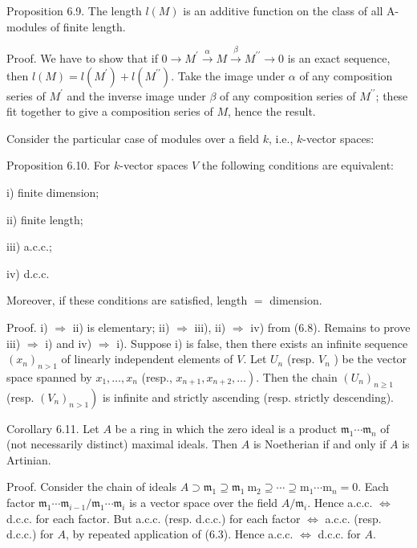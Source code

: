 \documentclass{standalone}
\theoremstyle{definition}
\theoremstyle{remark}
\begin{document}
Proposition 6.9. The length $l(M)$ is an additive function on the class of all A-modules of finite length.

Proof. We have to show that if $0 \rightarrow M^{\prime} \stackrel{\alpha}{\rightarrow} M \stackrel{\beta}{\rightarrow} M^{\prime \prime} \rightarrow 0$ is an exact sequence, then $l(M)=l\left(M^{\prime}\right)+l\left(M^{\prime \prime}\right)$. Take the image under $\alpha$ of any composition series of $M^{\prime}$ and the inverse image under $\beta$ of any composition series of $M^{\prime \prime}$; these fit together to give a composition series of $M$, hence the result.

Consider the particular case of modules over a field $k$, i.e., $k$-vector spaces:

Proposition 6.10. For $k$-vector spaces $V$ the following conditions are equivalent:

i) finite dimension;

ii) finite length;

iii) a.c.c.;

iv) d.c.c.

Moreover, if these conditions are satisfied, length $=$ dimension.

Proof. i) $\Rightarrow$ ii) is elementary; ii) $\Rightarrow$ iii), ii) $\Rightarrow$ iv) from (6.8). Remains to prove iii) $\Rightarrow$ i) and iv) $\Rightarrow$ i). Suppose i) is false, then there exists an infinite sequence $\left(x_{n}\right)_{n>1}$ of linearly independent elements of $V$. Let $U_{n}$ (resp. $V_{n}$ ) be the vector space spanned by $x_{1}, \ldots, x_{n}$ (resp., $\left.x_{n+1}, x_{n+2}, \ldots\right)$. Then the chain $\left(U_{n}\right)_{n \geqslant 1}$ (resp. $\left.\left(V_{n}\right)_{n>1}\right)$ is infinite and strictly ascending (resp. strictly descending).

Corollary 6.11. Let $A$ be a ring in which the zero ideal is a product $\mathfrak{m}_{1} \cdots \mathfrak{m}_{n}$ of (not necessarily distinct) maximal ideals. Then $A$ is Noetherian if and only if $A$ is Artinian.

Proof. Consider the chain of ideals $A \supset \mathfrak{m}_{1} \supseteq \mathfrak{m}_{1} \mathrm{~m}_{2} \supseteq \cdots \supseteq \mathrm{m}_{1} \cdots \mathrm{m}_{n}=0$. Each factor $\mathfrak{m}_{1} \cdots \mathfrak{m}_{i-1} / \mathfrak{m}_{1} \cdots \mathfrak{m}_{i}$ is a vector space over the field $A / \mathfrak{m}_{i}$. Hence a.c.c. $\Leftrightarrow$ d.c.c. for each factor. But a.c.c. (resp. d.c.c.) for each factor $\Leftrightarrow$ a.c.c. (resp. d.c.c.) for $A$, by repeated application of (6.3). Hence a.c.c. $\Leftrightarrow$ d.c.c. for $A$.
\end{document}
